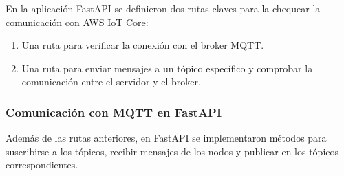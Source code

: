 
En la aplicación FastAPI se definieron dos rutas claves para la chequear la
comunicación con AWS IoT Core:

\begin{enumerate}
    \item Una ruta para verificar la conexión con el broker MQTT.
    \item Una ruta para enviar mensajes a un tópico específico y comprobar la
          comunicación entre el servidor y el broker.
\end{enumerate}





\subsubsection{Comunicación con MQTT en FastAPI}

Además de las rutas anteriores, en FastAPI se implementaron métodos para
suscribirse a los tópicos, recibir mensajes de los nodos y publicar en los
tópicos correspondientes.

